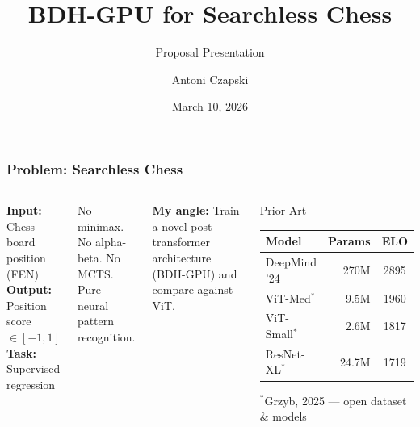 \documentclass{beamer}
\title[BDH Searchless Chess]{BDH-GPU for Searchless Chess}
\subtitle{Proposal Presentation}
\author{Antoni Czapski}
\institute[]{Project: Deep Learning}
\date{March 10, 2026}
\begin{document}
\frame{\titlepage}

\begin{frame}
\frametitle{Problem: Searchless Chess}

\begin{columns}

\textbf{Input:} Chess board position (FEN)\\
\textbf{Output:} Position score $\in [-1, 1]$\\
\textbf{Task:} Supervised regression

\vspace{1em}
No minimax. No alpha-beta. No MCTS.\\
\alert{Pure neural pattern recognition.}

\vspace{1em}
\textbf{My angle:} Train a novel \alert{post-transformer} architecture (BDH-GPU) and compare against ViT.

\begin{block}{Prior Art}
\footnotesize
\begin{tabular}{lrc}
\toprule
\textbf{Model} & \textbf{Params} & \textbf{ELO} \\
\midrule
DeepMind '24 & 270M & 2895 \\
ViT-Med$^*$ & 9.5M & 1960 \\
ViT-Small$^*$ & 2.6M & 1817 \\
ResNet-XL$^*$ & 24.7M & 1719 \\
\bottomrule
\end{tabular}

\vspace{0.3em}
{\tiny $^*$Grzyb, 2025 --- open dataset \& models}
\end{block}
\end{columns}

\end{frame}
\end{document}
